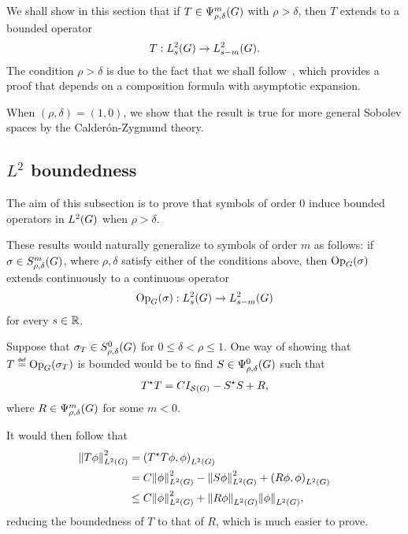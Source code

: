 We shall show in this section that if $T \in \OperatorClass m {\rho, \delta}$ with $\rho > \delta$,
then $T$ extends to a bounded operator
\begin{align*}
    T : \Sobolev s \to \Sobolev {s - m}.
\end{align*}
The condition $\rho > \delta$ is due to the fact that
we shall follow~\cite{RuzhanskyWirth14},
which provides a proof that depends on a composition formula with asymptotic expansion.

When $(\rho, \delta) = (1, 0)$,
we show that the result is true for more general Sobolev spaces by the Calder\'on-Zygmund theory.

\subsection{\texorpdfstring{$L^2$}{L2} boundedness}

The aim of this subsection is to prove
that symbols of order $0$ induce bounded operators in $\Lebesgue 2 \Group$
when $\rho > \delta$.

These results would naturally generalize to symbols of order $m$ as follows:
if $\sigma \in \SymbolClass m {\rho, \delta}$,
where $\rho, \delta$ satisfy either of the conditions above,
then $\Op(\sigma)$ extends continuously to a continuous operator
\begin{align*}
    \Op(\sigma) : \Sobolev s \to \Sobolev {s - m}
\end{align*}
for every $s \in \R$.

Suppose that $\sigma_T \in \SymbolClass 0 {\rho, \delta}$ for $0 \leq \delta < \rho \leq 1$.
One way of showing that $T \defeq \Op(\sigma_T)$ is bounded would be to find $S \in \OperatorClass 0 {\rho, \delta}$ such that
\begin{align}
    \adj T T = C \Id {\Schwartz \Group} - \adj S S + R,
    \label{eq:L2_boundedness_decomposition}
\end{align}
where $R \in \OperatorClass m {\rho, \delta}$ for some $m < 0$.

It would then follow that
\begin{align*}
    \norm [\Lebesgue 2 \Group] {T \phi}^2
    &= \ip [\Lebesgue 2 \Group] {\adj T T \phi} \phi\\
    &= C \norm [\Lebesgue 2 \Group] {\phi}^2 - \norm [\Lebesgue 2 \Group] {S \phi}^2 + \ip [\Lebesgue 2 \Group] {R \phi} \phi\\
    &\leq C \norm [\Lebesgue 2 \Group] {\phi}^2 + \norm [\Lebesgue 2 \Group] {R \phi} \norm [\Lebesgue 2 \Group] \phi,
\end{align*}
reducing the boundedness of $T$ to that of $R$,
which is much easier to prove.

